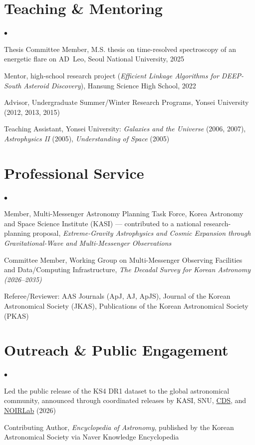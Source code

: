 \documentclass[letterpaper,11pt]{article}
\newenvironment{cvitemize}{
  \begin{list}{$\bullet$}{
    \setlength{\leftmargin}{1.5em}
    \setlength{\itemsep}{0.2em}
    \setlength{\parsep}{0em}
  }
}{
  \end{list}
}
\begin{document}
\section*{Teaching \& Mentoring}
\begin{cvitemize}
\item Thesis Committee Member, M.S. thesis on time-resolved spectroscopy of an
      energetic flare on AD~Leo, Seoul National University, 2025
\item Mentor, high-school research project (\emph{Efficient Linkage Algorithms for
      DEEP-South Asteroid Discovery}), Hansung Science High School, 2022
\item Advisor, Undergraduate Summer/Winter Research Programs, Yonsei University
      (2012, 2013, 2015)
\item Teaching Assistant, Yonsei University: \emph{Galaxies and the Universe} (2006, 2007),
      \emph{Astrophysics II} (2005), \emph{Understanding of Space} (2005)
\end{cvitemize}

\section*{Professional Service}
\begin{cvitemize}
\item Member, Multi-Messenger Astronomy Planning Task Force, Korea Astronomy and Space
      Science Institute (KASI) --- contributed to a national research-planning proposal,
      \emph{Extreme-Gravity Astrophysics and Cosmic Expansion through Gravitational-Wave
      and Multi-Messenger Observations}
\item Committee Member, Working Group on Multi-Messenger Observing Facilities and
      Data/Computing Infrastructure, \emph{The Decadal Survey for Korean Astronomy
      (2026--2035)}
\item Referee/Reviewer: AAS Journals (ApJ, AJ, ApJS), Journal of the Korean Astronomical
      Society (JKAS), Publications of the Korean Astronomical Society (PKAS)
\end{cvitemize}


\section*{Outreach \& Public Engagement}
\begin{cvitemize}
\item Led the public release of the KS4 DR1 dataset to the global astronomical community,
      announced through coordinated releases by KASI, SNU,
      \href{https://cds.unistra.fr/blog/2026/04/29-ks4-data-release/}{CDS}, and
      \href{https://noirlab.edu/science/news/announcements/sci26025}{NOIRLab} (2026)
\item Contributing Author, \emph{Encyclopedia of Astronomy}, published by the Korean
      Astronomical Society via Naver Knowledge Encyclopedia
\end{cvitemize}
\end{document}
